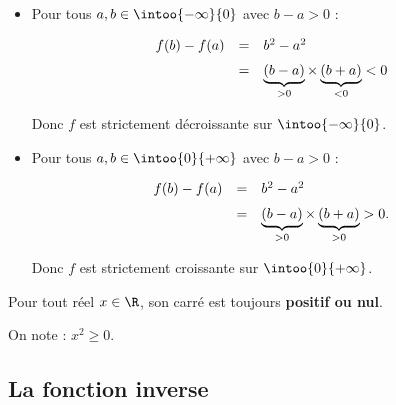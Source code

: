 \begin{itemize}
	\item Pour tous $a,b\in\intoo{-\infty}{0}$ avec $b-a>0$ :
	      \[
		      \def\arraystretch{1.5}
		      \begin{array}{rcl}
			      f(b)-f(a) & = & b^{2}-a^{2}                                            \\
			                & = & \underbrace{(b-a)}_{>0}\times\underbrace{(b+a)}_{<0}<0
		      \end{array}
	      \]

	      Donc $f$ est strictement décroissante sur $\intoo{-\infty}{0}$.

	\item Pour tous $a,b\in\intoo{0}{+\infty}$ avec $b-a>0$ :
	      \[
		      \def\arraystretch{1.5}
		      \begin{array}{rcl}
			      f(b)-f(a) & = & b^{2}-a^{2}                                             \\
			                & = & \underbrace{(b-a)}_{>0}\times\underbrace{(b+a)}_{>0}>0.
		      \end{array}
	      \]

	      Donc $f$ est strictement croissante sur $\intoo{0}{+\infty}$.

\end{itemize}

\prop

\def\manote{\null\\ \begin{tikzpicture}\tkzTabInit[lgt=1, espcl=1.25]{$x$ / 0.75, $x^2$ / 0.75}{$-\infty$, $0$, $+\infty$}\tkzTabLine{ , +, z, +, }\end{tikzpicture}}

Pour tout réel $x \in \R$, son carré est toujours \textbf{positif ou nul}\sidenote{\manote}.

On note : $x^2 \geq 0$.

\subsection{La fonction inverse}


\def\manote{\null\\ \begin{tikzpicture}[x=6.5mm,y=6.5mm, >=Triangle]
		\draw[->] (-4,0) -- (4,0) node[right] {$x$};
		\draw[->] (0,-4) -- (0,4) node[above] {$y$};
		\foreach \x in {-3,-2,-1,1,2,3}
		\draw (\x,0.1) -- (\x,-0.1) node[below, scale=0.8] {$\x$};
		\foreach \y in {-3,-2,-1,1,2,3}
		\draw (0.1,\y) -- (-0.1,\y) node[left, scale=0.8] {$\y$};
		\draw[very thick, blue, domain=-4:-0.25, samples=50] plot (\x, {1.0/\x});
		\draw[very thick, blue, domain=0.25:4, samples=50] plot (\x, {1.0/\x});
		\node[blue] at (1,3.5) {$\Cf$};
		\draw[dashed, gray, thin] (-1,0) -- (-1,-1) -- (0,-1);
		\draw[dashed, gray, thin] (1,0) -- (1,1) -- (0,1);
		\fill[black] (1,1) circle (2pt) node[black, above right] {$(1,1)$};
		\fill[black] (-1,-1) circle (2pt) node[black, below left] {$(-1,-1)$};
	\end{tikzpicture}}

